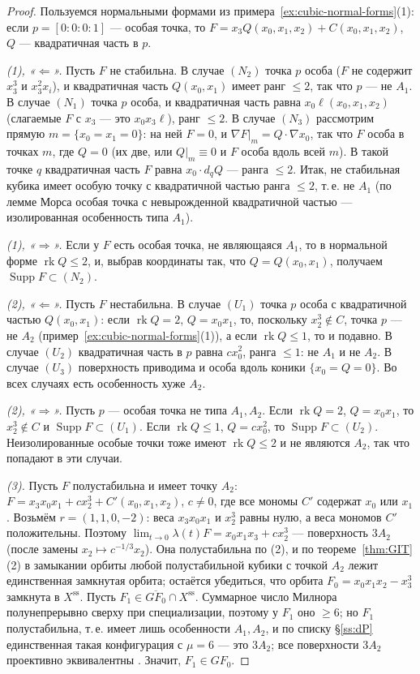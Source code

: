 \documentclass[11pt,a4paper]{article}
\theoremstyle{plain}
\theoremstyle{definition}
\theoremstyle{remark}
\DeclareMathOperator{\rk}{rk}
\DeclareMathOperator{\Supp}{Supp}
\newcommand{\ssl}{\mathrm{ss}}
\begin{document}
\begin{proof}
Пользуемся нормальными формами из примера~\ref{ex:cubic-normal-forms}(1): если $p=[0:0:0:1]$ ---
особая точка, то $F=x_3Q(x_0,x_1,x_2)+C(x_0,x_1,x_2)$, $Q$ --- квадратичная часть в $p$.

\emph{(1), «$\Leftarrow$».} Пусть $F$ не стабильна. В случае $(N_2)$ точка $p$ особа ($F$ не
содержит $x_3^3$ и $x_3^2x_i$), и квадратичная часть $Q(x_0,x_1)$ имеет ранг $\le2$, так что $p$
--- не $A_1$. В случае $(N_1)$ точка $p$ особа, и квадратичная часть равна
$x_0\ell(x_0,x_1,x_2)$ (слагаемые $F$ с $x_3$ --- это $x_0x_3\ell$), ранг $\le2$. В случае $(N_3)$
рассмотрим прямую $m=\{x_0=x_1=0\}$: на ней $F=0$, и $\nabla F|_m=Q\cdot\nabla x_0$, так что $F$
особа в точках $m$, где $Q=0$ (их две, или $Q|_m\equiv0$ и $F$ особа вдоль всей $m$). В такой
точке $q$ квадратичная часть $F$ равна $x_0\cdot d_qQ$ --- ранга $\le2$. Итак, не стабильная
кубика имеет особую точку с квадратичной частью ранга $\le2$, т.\,е. не $A_1$ (по лемме Морса
особая точка с невырожденной квадратичной частью --- изолированная особенность типа $A_1$).

\emph{(1), «$\Rightarrow$».} Если у $F$ есть особая точка, не являющаяся $A_1$, то в нормальной
форме $\rk Q\le2$, и, выбрав координаты так, что $Q=Q(x_0,x_1)$, получаем $\Supp F\subset(N_2)$.

\emph{(2), «$\Leftarrow$».} Пусть $F$ нестабильна. В случае $(U_1)$ точка $p$ особа с
квадратичной частью $Q(x_0,x_1)$: если $\rk Q=2$, $Q=x_0x_1$, то, поскольку $x_2^3\notin C$, точка
$p$ --- не $A_2$ (пример~\ref{ex:cubic-normal-forms}(1)), а если $\rk Q\le1$, то и подавно. В
случае $(U_2)$ квадратичная часть в $p$ равна $cx_0^2$, ранга $\le1$: не $A_1$ и не $A_2$. В случае
$(U_3)$ поверхность приводима и особа вдоль коники $\{x_0=Q=0\}$. Во всех случаях есть особенность
хуже $A_2$.

\emph{(2), «$\Rightarrow$».} Пусть $p$ --- особая точка не типа $A_1,A_2$. Если $\rk Q=2$, $Q=x_0x_1$,
то $x_2^3\notin C$ и $\Supp F\subset(U_1)$. Если $\rk Q\le1$, $Q=cx_0^2$, то $\Supp F\subset(U_2)$.
Неизолированные особые точки тоже имеют $\rk Q\le2$ и не являются $A_2$, так что попадают в эти
случаи.

\emph{(3).} Пусть $F$ полустабильна и имеет точку $A_2$: $F=x_3x_0x_1+cx_2^3+C'(x_0,x_1,x_2)$,
$c\ne0$, где все мономы $C'$ содержат $x_0$ или $x_1$. Возьмём $r=(1,1,0,-2)$: веса $x_3x_0x_1$ и
$x_2^3$ равны нулю, а веса мономов $C'$ положительны. Поэтому
$\lim_{t\to0}\lambda(t)F=x_0x_1x_3+cx_2^3$ --- поверхность $3A_2$ (после замены $x_2\mapsto c^{-1/3}x_2$).
Она полустабильна по (2), и по теореме~\ref{thm:GIT}(2) в замыкании орбиты любой полустабильной
кубики с точкой $A_2$ лежит единственная замкнутая орбита; остаётся убедиться, что орбита
$F_0=x_0x_1x_2-x_3^3$ замкнута в $X^{\ssl}$. Пусть $F_1\in\overline{GF_0}\cap X^{\ssl}$. Суммарное число
Милнора полунепрерывно сверху при специализации, поэтому у $F_1$ оно $\ge6$; но $F_1$ полустабильна,
т.\,е. имеет лишь особенности $A_1,A_2$, и по списку \S\ref{ss:dP} единственная такая конфигурация
с $\mu=6$ --- это $3A_2$; все поверхности $3A_2$ проективно эквивалентны \cite{BW}. Значит,
$F_1\in GF_0$.
\end{proof}
\end{document}
